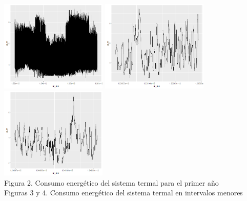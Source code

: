 \documentclass[../Main.tex]{subfiles}
\begin{document}
\begin{center}
\includegraphics[width=2in]{Assets/power1SumAll.png}
\includegraphics[width=2in]{Assets/power1Sum5hk1k.png}
\includegraphics[width=2in]{Assets/power1Sum9hk1k.png}
\\Figura 2. Consumo energético del sistema termal para el primer año
\\Figuras 3 y 4. Consumo energético del sistema termal en intervalos menores
\end{center}
\end{document}
